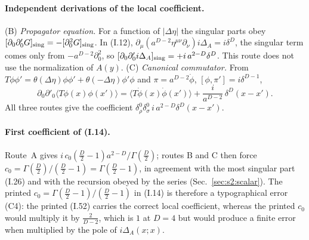 \documentclass[aps,prd,onecolumn,10pt,nofootinbib,floatfix]{revtex4-2}
\newcommand{\eqI}[1]{(I.#1)}
\begin{document}
\paragraph*{Independent derivations of the local coefficient.}
(B) \emph{Propagator equation.} For a function of $|\Delta\eta|$ the singular parts obey
$[\partial_0\partial'_0G]_{\rm sing}=-[\partial_0^2G]_{\rm sing}$. In \eqI{12},
$\partial_\mu(a^{D-2}\eta^{\mu\nu}\partial_\nu)i\Delta_A=i\delta^D$, the singular term comes only from
$-a^{D-2}\partial_0^2$, so $[\partial_0\partial'_0i\Delta_A]_{\rm sing}=+i\,a^{2-D}\delta^D$. This route does
not use the normalization of $A(y)$.
(C) \emph{Canonical commutator.} From $T\phi\phi'=\theta(\Delta\eta)\phi\phi'+\theta(-\Delta\eta)\phi'\phi$ and
$\pi=a^{D-2}\dot\phi$, $[\phi,\pi']=i\delta^{D-1}$,
\begin{equation}
\partial_0\partial'_0\langle T\phi(x)\phi(x')\rangle=\langle T\dot\phi(x)\dot\phi(x')\rangle+\frac{i}{a^{D-2}}\,\delta^D(x-x').
\label{eq:s4a:routeC}
\end{equation}
All three routes give the coefficient $\delta^0_\rho\delta^0_\sigma\,i\,a^{2-D}\delta^D(x-x')$.

\paragraph*{First coefficient of (I.14).}
Route~A gives $i\,c_0(\frac D2-1)a^{2-D}/\Gamma(\frac D2)$; routes B and C then force
$c_0=\Gamma(\frac D2)/(\frac D2-1)=\Gamma(\frac D2-1)$, in agreement with the most singular part \eqI{26}
and with the recursion obeyed by the series (Sec.~\ref{sec:s2:scalar}). The printed
$c_0=\Gamma(\frac D2-1)/(\frac D2-1)$ in \eqI{14} is therefore a typographical error (C4): the printed
\eqI{52} carries the correct local coefficient, whereas the printed $c_0$ would multiply it by
$\frac{2}{D-2}$, which is $1$ at $D=4$ but would produce a finite error when multiplied by the pole of
$i\Delta_A(x;x)$.
\end{document}
